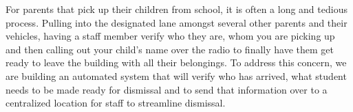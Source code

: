 \quad \quad For parents that pick up their children from school, it is often a long and tedious process. Pulling into the designated lane amongst several other parents and their vehicles, having a staff member verify who they are, whom you are picking up and then calling out your child's name over the radio to finally have them get ready to leave the building with all their belongings.  To address this concern, we are building an automated system that will verify who has arrived, what student needs to be made ready for dismissal and to send that information over to a centralized location for staff to streamline dismissal. 